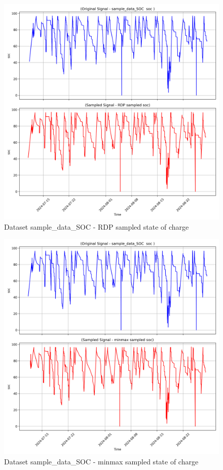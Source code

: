 \begin{figure}
    \centering
    \includegraphics[width=1\linewidth]{screenshots/sample_data_SOC/RDP_sampled_soc_screenshot.png}
    \caption{Dataset sample\_data\_SOC - RDP sampled state of charge }
    \label{fig:sample_data_SOC_RDP_sampled_soc_screenshot}
\end{figure}
\begin{figure}
    \centering
    \includegraphics[width=1\linewidth]{screenshots/sample_data_SOC/minmax_sampled_soc_screenshot.png}
    \caption{Dataset sample\_data\_SOC - minmax sampled state of charge }
    \label{fig:sample_data_SOC_minmax_sampled_soc_screenshot}
\end{figure}
